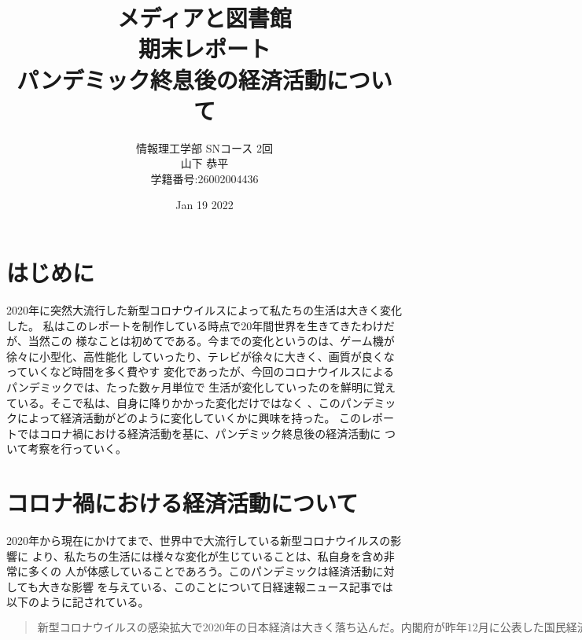 \documentclass[dvipdfmx,autodetect-engine,titlepage]{jsarticle}
\title{メディアと図書館\\
期末レポート\\
パンデミック終息後の経済活動について}
\author{情報理工学部 SNコース 2回\\
山下 恭平\\
学籍番号:26002004436}
\date{Jan 19 2022}
\begin{document}
\maketitle

\section{はじめに}
2020年に突然大流行した新型コロナウイルスによって私たちの生活は大きく変化した。
私はこのレポートを制作している時点で20年間世界を生きてきたわけだが、当然この
様なことは初めてである。今までの変化というのは、ゲーム機が徐々に小型化、高性能化
していったり、テレビが徐々に大きく、画質が良くなっていくなど時間を多く費やす
変化であったが、今回のコロナウイルスによるパンデミックでは、たった数ヶ月単位で
生活が変化していったのを鮮明に覚えている。そこで私は、自身に降りかかった変化だけではなく
、このパンデミックによって経済活動がどのように変化していくかに興味を持った。
このレポートではコロナ禍における経済活動を基に、パンデミック終息後の経済活動に
ついて考察を行っていく。

\section{コロナ禍における経済活動について}
2020年から現在にかけてまで、世界中で大流行している新型コロナウイルスの影響に
より、私たちの生活には様々な変化が生じていることは、私自身を含め非常に多くの
人が体感していることであろう。このパンデミックは経済活動に対しても大きな影響
を与えている、このことについて日経速報ニュース記事では以下のように記されている。

  \begin{quote}
    \begin{math}
      新型コロナウイルスの感染拡大で2020年の日本経済は大きく落ち込んだ。
      内閣府が昨年12月に公表した国民経済計算の20年度年次推計では、国内総生産（GDP）における
      暦年での付加価値の生産額を業種ごとにみることができる。コロナ禍は経済全体を
      押し下げたものの、「電気業」や「建設業」など業種によっては生産額を増やし、明暗が分かれた。^{(1)}
    \end{math}
  \end{quote}
\end{document}
